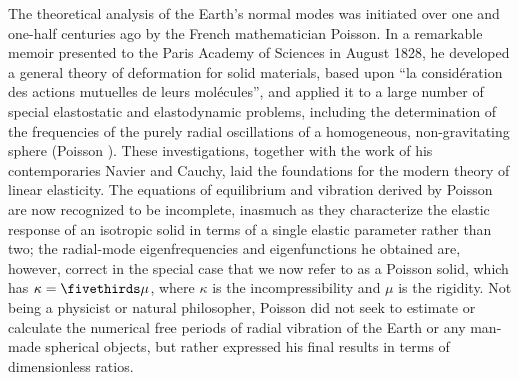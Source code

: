 The theoretical analysis of the Earth's normal modes was
initiated over one and one-half centuries ago by the French
mathematician Poisson.  In a remarkable memoir presented
to the Paris Academy of Sciences in August 1828, he developed
a general theory of deformation for solid materials, based upon
``la consid\'{e}ration des actions mutuelles de leurs mol\'{e}cules'',
and applied it to a large number of special elastostatic
and elastodynamic problems, including the determination
of the frequencies of the purely radial oscillations of a
homogeneous, non-gravitating sphere (Poisson \citeyear{poisson29}).
These investigations, together with the work of his contemporaries Navier and
Cauchy, laid the foundations for the modern theory of linear elasticity.
The equations of equilibrium and vibration derived by Poisson are now
recognized to be incomplete, inasmuch as they characterize the elastic
response of an isotropic solid in terms of a single elastic parameter rather
than two; the radial-mode eigenfrequencies and eigenfunctions he obtained are,
however, correct in the special case that we now refer to as a Poisson solid,
%
which has $\kappa=\fivethirds\mu$, where $\kappa$ is the incompressibility
and $\mu$ is the rigidity.  Not being a physicist or natural philosopher,
Poisson did not seek to estimate or calculate the numerical free
periods of radial vibration of the Earth or any man-made spherical objects,
but rather expressed his final results in terms of dimensionless ratios.

